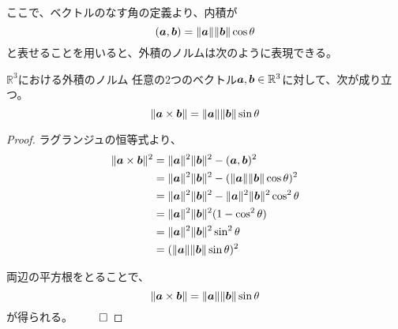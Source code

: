 \documentclass[../../../topic_linear-algebra]{subfiles}
\begin{document}
ここで、ベクトルのなす角の定義より、内積が
\begin{equation*}
  (\vb*{a}, \vb*{b}) = \|\vb*{a}\| \|\vb*{b}\| \cos \theta
\end{equation*}
と表せることを用いると、外積のノルムは次のように表現できる。

\begin{theorem*}{$\mathbb{R}^3$における外積のノルム}
  任意の2つのベクトル$\vb*{a}, \vb*{b} \in \mathbb{R}^3$に対して、次が成り立つ。
  \begin{equation*}
    \| \vb*{a} \times \vb*{b} \| = \| \vb*{a} \| \| \vb*{b} \| \sin \theta
  \end{equation*}
\end{theorem*}

\begin{proof}
  ラグランジュの恒等式より、
  \begin{align*}
    \| \vb*{a} \times \vb*{b} \|^2
    &= \| \vb*{a} \|^2 \| \vb*{b} \|^2 - ( \vb*{a}, \vb*{b} )^2 \\
    &= \| \vb*{a} \|^2 \| \vb*{b} \|^2 - (\| \vb*{a} \| \| \vb*{b} \| \cos \theta)^2 \\
    &= \| \vb*{a} \|^2 \| \vb*{b} \|^2 - \| \vb*{a} \|^2 \| \vb*{b} \|^2 \cos^2 \theta \\
    &= \| \vb*{a} \|^2 \| \vb*{b} \|^2 (1 - \cos^2 \theta) \\
    &= \| \vb*{a} \|^2 \| \vb*{b} \|^2 \sin^2 \theta \\
    &= (\| \vb*{a} \| \| \vb*{b} \| \sin \theta)^2
  \end{align*}
  
  両辺の平方根をとることで、
  \begin{equation*}
    \| \vb*{a} \times \vb*{b} \| = \| \vb*{a} \| \| \vb*{b} \| \sin \theta
  \end{equation*}
  が得られる。 $\qed$
\end{proof}

\begin{mindflow}
\end{mindflow}
\end{document}
